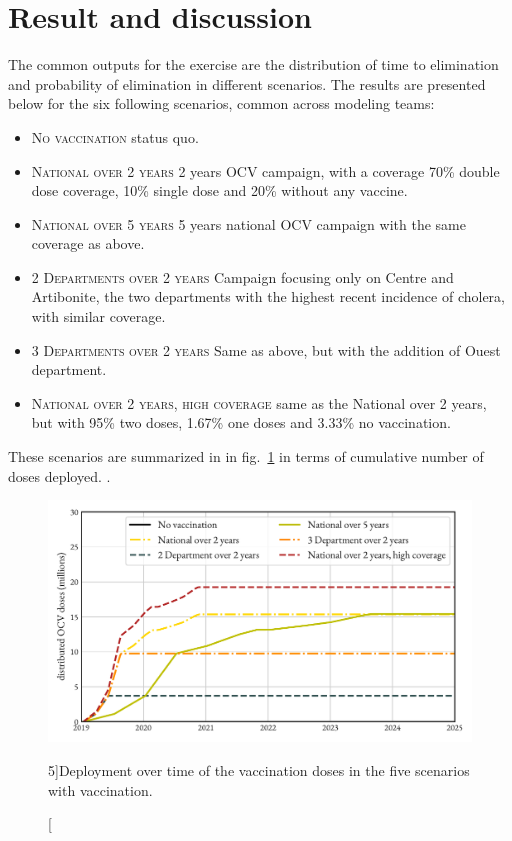\section{Result and discussion}
The common outputs for the exercise are the distribution of time to elimination and probability of elimination in different scenarios. The results are presented below for the six following scenarios, common across modeling teams:
\begin{itemize}
	\item \textsc{No vaccination} status quo.
	\item \textsc{National over 2 years} 2 years OCV campaign, with a coverage 70\% double dose coverage, 10\% single dose and 20\% without any vaccine.
	\item 	 \textsc{National over 5 years} 5 years national OCV campaign with the same coverage as above.
	\item \textsc{2 Departments over 2 years} Campaign focusing only on Centre and Artibonite, the two departments with the highest recent incidence of cholera, with similar coverage.
	\item \textsc{3 Departments over 2 years} Same as above, but with the addition of Ouest department.
	\item \textsc{National over 2 years, high coverage} same as the National over 2 years, but with 95\% two doses, 1.67\% one doses and 3.33\% no vaccination.
\end{itemize}
These scenarios are summarized in in fig.~\ref{fig:deploy} in terms of cumulative number of doses deployed. .

\begin{figure}
\begin{center}
\includegraphics{fig_cholera-haiti-ocv/haiti-deploy.pdf}
\caption[Deployment the vaccination doses in the considered scenarios.][5\baselineskip]{Deployment over time of the vaccination doses in the five scenarios with vaccination.}\label{fig:deploy}
\end{center}
\end{figure}

